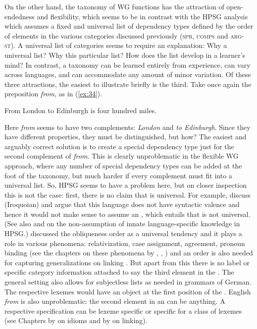 \documentclass[output=paper
 	        ,biblatex
                ,babelshorthands
                ,newtxmath
                ,draftmode
                ,colorlinks, citecolor=brown
]{langscibook}
\begin{document}
On the other hand, the taxonomy of WG functions has the attraction of open-endedness and
flexibility, which seems to be in contrast with the HPSG analysis which assumes a fixed and universal list of
dependency types defined by the order of elements in the various categories discussed previously
(\textsc{spr}, \textsc{comps} and \textsc{arg-st}). A universal list of categories seems to require an
explanation: Why a universal list? Why this particular list? How does the list develop in a
learner's mind? In contrast, a taxonomy can be learned entirely from experience, can vary across
languages, and can accommodate any amount of minor variation. Of these three attractions, the
easiest to illustrate briefly is the third. Take once again the  preposition
\emph{from}, as in (\ref{ex:34}).
%
\begin{exe}
\ex \label{ex:34} From London to Edinburgh is four hundred miles.
\end{exe}
%
\noindent
Here \emph{from} seems to have two complements: \emph{London} and \emph{to Edinburgh}. Since they
have different properties, they must be distinguished, but how? The easiest and arguably correct
solution is to create a special dependency type just for the second complement of \emph{from}. This
is clearly unproblematic in the flexible WG approach, where any number of special dependency types
can be added at the foot of the taxonomy, but much harder if every complement must fit into a
universal list. So, HPSG seems to have a problem here, but on closer inspection this is not the
case: first, there is no claim that \argst is universal. For example, \citet{KM15a-u} discuss 
(Iroquoian) and argue that this language does not have syntactic valence and hence it would not make
sense to assume an \argstl, which entails that \argst is not universal. (See also
 and
 on the non-assumption
of innate language-specific knowledge in HPSG.) \citet{KC77a} discussed
the obliqueness order as a universal tendency and it plays a role in various phenomena:
relativization, case assignment, agreement, pronoun binding (see the chapters on these phenomena by
\citealt{chapters/case}, \citealt{chapters/agreement}, \citealt{chapters/binding}) and an order is also
needed for capturing generalizations on linking \citep*{chapters/arg-st}. But apart from this there
is no label or specific category information attached to say the third element in the
\argstl. The general setting also allows for subjectless \argst lists as needed in grammars of
German. The respective lexemes would have an object at the first position of the \argstl.
English \emph{from} is also unproblematic: the second element in an \argstl can be
anything. A respective specification can be lexeme specific or specific for a class of lexemes (see
Chapters by \citet*{chapters/idioms} on idioms and by \citet*{chapters/arg-st} on linking).
\end{document}
